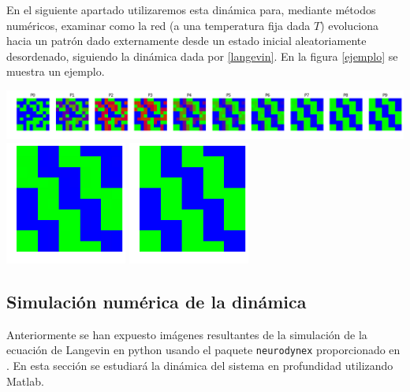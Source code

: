 \documentclass[titlepage,12pt]{article}
\numberwithin{equation}{section}
\begin{document}
	En el siguiente apartado utilizaremos esta dinámica para, mediante métodos numéricos, examinar como la red (a una temperatura fija dada $T$) evoluciona hacia un patrón dado externamente desde un estado inicial aleatoriamente desordenado, siguiendo la dinámica dada por \eqref{langevin}. En la figura \ref{ejemplo} se muestra un ejemplo.
	\begin{center}
		\includegraphics[width=16cm]{pasos.png}
		\includegraphics[width=4cm]{final.png} \includegraphics[width=4cm]{patron.png}
		 \label{ejemplo}
	\end{center}
	\subsection{Simulación numérica de la dinámica}
	Anteriormente se han expuesto imágenes resultantes de la simulación de la ecuación de Langevin en python usando el paquete \verb|neurodynex| proporcionado en \cite{neurodyn-ex}. En esta sección se estudiará la dinámica del sistema en profundidad utilizando Matlab.
	
\end{document}
